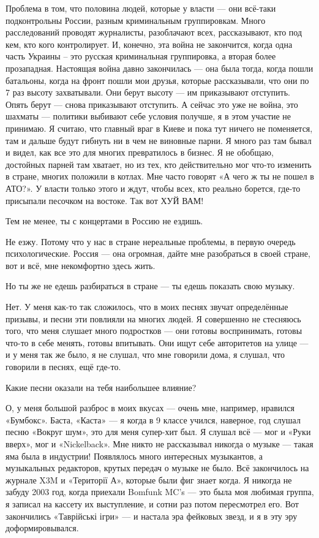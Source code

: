 Проблема в том, что половина людей, которые у власти --- они всё-таки
подконтрольны России, разным криминальным группировкам. Много расследований
проводят журналисты, разоблачают всех, рассказывают, кто под кем, кто кого
контролирует. И, конечно, эта война не закончится, когда одна часть Украины –
это русская криминальная группировка, а вторая более прозападная. Настоящая
война давно закончилась --- она была тогда, когда пошли батальоны, когда на фронт
пошли мои друзья, которые рассказывали, что они по 7 раз высоту захватывали.
Они берут высоту --- им приказывают отступить. Опять берут --- снова приказывают
отступить. А сейчас это уже не война, это шахматы --- политики выбивают себе
условия получше, я в этом участие не принимаю. Я считаю, что главный враг в
Киеве и пока тут ничего не поменяется, там и дальше будут гибнуть ни в чем не
виновные парни. Я много раз там бывал и видел, как все это для многих
превратилось в бизнес. Я не обобщаю, достойных парней там хватает, но из тех,
кто действительно мог что-то изменить в стране, многих положили в котлах. Мне
часто говорят «А чего ж ты не пошел в АТО?».  У власти только этого и ждут,
чтобы всех, кто реально борется, где-то присыпали песочком на востоке. Так вот
ХУЙ ВАМ!

Тем не менее, ты с концертами в Россию не ездишь.

Не езжу. Потому что у нас в стране нереальные проблемы, в первую очередь
психологические. Россия --- она огромная, дайте мне разобраться в своей стране,
вот и всё, мне некомфортно здесь жить.

Но ты же не едешь разбираться в стране --- ты едешь показать свою музыку.

Нет. У меня как-то так сложилось, что в моих песнях звучат определённые
призывы,  и песни эти повлияли на многих людей. Я совершенно не стесняюсь того,
что меня слушает много подростков --- они готовы воспринимать, готовы что-то в
себе менять, готовы впитывать. Они ищут себе авторитетов на улице --- и у меня
так же было, я не слушал, что мне говорили дома, я слушал, что говорили в
песнях, ещё где-то.

Какие песни оказали на тебя наибольшее влияние?

О, у меня большой разброс в моих вкусах --- очень мне, например, нравился «Бумбокс». Баста, «Каста» --- я когда в 9 классе учился, наверное, год слушал песню «Вокруг шум», это для меня супер-хит был. Я слушал всё --- мог и «Руки вверх», мог и «Nickelback».  Мне никто не рассказывал никогда о музыке --- такая яма была в индустрии! Появлялось много интересных музыкантов, а музыкальных редакторов, крутых передач о музыке не было. Всё закончилось на журнале X3M и «Території А», которые были фиг знает когда. Я никогда не забуду 2003 год, когда приехали Bomfunk MC’s --- это была моя любимая группа, я записал на кассету их выступление, и сотни раз потом пересмотрел его. Вот закончились «Таврійські ігри» --- и настала эра фейковых звезд, и я в эту эру доформировывался.

